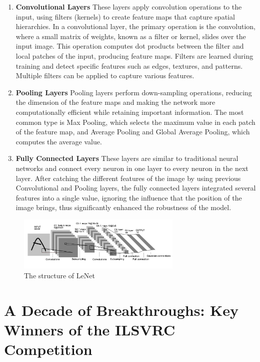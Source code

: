 \documentclass[a4paper]{article}
\begin{document}
\begin{enumerate}
\item \textbf{Convolutional Layers} These layers apply convolution operations to the input, using filters (kernels) to create feature maps that capture spatial hierarchies. In a convolutional layer, the primary operation is the convolution, where a small matrix of weights, known as a filter or kernel, slides over the input image. This operation computes dot products between the filter and local patches of the input, producing feature maps. Filters are learned during training and detect specific features such as edges, textures, and patterns. Multiple filters can be applied to capture various features.
\item \textbf{Pooling Layers} Pooling layers perform down-sampling operations, reducing the dimension of the feature maps and making the network more computationally efficient while retaining important information. The most common type is Max Pooling\citep{726791}, which selects the maximum value in each patch of the feature map, and Average Pooling and Global Average Pooling\citep{Lin2013NetworkIN}, which computes the average value.
\item \textbf{Fully Connected Layers} These layers are similar to traditional neural networks and connect every neuron in one layer to every neuron in the next layer. After catching the different features of the image by using previous Convolutional and Pooling layers, the fully connected layers integrated several features into a single value, ignoring the influence that the position of the image brings, thus significantly enhanced the robustness of the model.
\end{enumerate}

\begin{figure}[ht]
    \centering
    \includegraphics[width=0.7\textwidth,height=0.25\textwidth]{images/Lenet.png}
    \caption{The structure of LeNet\citet{726791}}
\end{figure}


\section{A Decade of Breakthroughs: Key Winners of the ILSVRC Competition}
\end{document}
